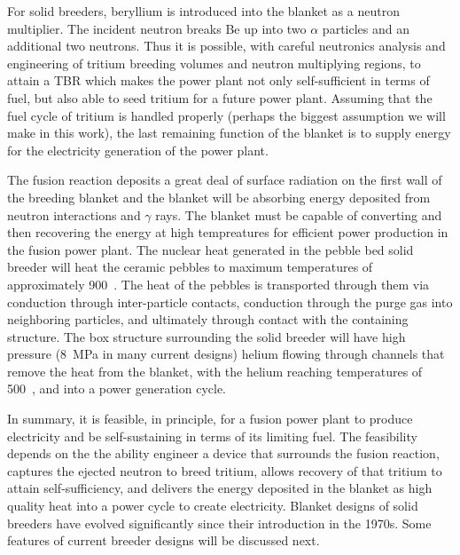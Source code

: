 For solid breeders, beryllium is introduced into the blanket as a neutron multiplier. The incident neutron breaks Be up into two $\alpha$ particles and an additional two neutrons. Thus it is possible, with careful neutronics analysis and engineering of tritium breeding volumes and neutron multiplying regions, to attain a TBR which makes the power plant not only self-sufficient in terms of fuel, but also able to seed tritium for a future power plant. Assuming that the fuel cycle of tritium is handled properly (perhaps the biggest assumption we will make in this work), the last remaining function of the blanket is to supply energy for the electricity generation of the power plant. 

The fusion reaction deposits a great deal of surface radiation on the first wall of the breeding blanket and the blanket will be absorbing energy deposited from neutron interactions and $\gamma$ rays. The blanket must be capable of converting and then recovering the energy at high tempreatures for efficient power production in the fusion power plant. The nuclear heat generated in the pebble bed solid breeder will heat the ceramic pebbles to maximum temperatures of approximately 900~\celsius. The heat of the pebbles is transported through them via conduction through inter-particle contacts, conduction through the purge gas into neighboring particles, and ultimately through contact with the containing structure. The box structure surrounding the solid breeder will have high pressure (\si{8~MPa} in many current designs) helium flowing through channels that remove the heat from the blanket, with the helium reaching temperatures of 500~\celsius, and into a power generation cycle.

In summary, it is feasible, in principle, for a fusion power plant to produce electricity and be self-sustaining in terms of its limiting fuel. The feasibility depends on the the ability engineer a device that surrounds the fusion reaction, captures the ejected neutron to breed tritium, allows recovery of that tritium to attain self-sufficiency, and delivers the energy deposited in the blanket as high quality heat into a power cycle to create electricity. Blanket designs of solid breeders have evolved significantly since their introduction in the 1970s. Some features of current breeder designs will be discussed next.



